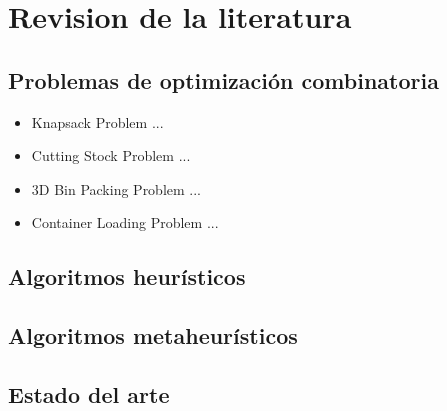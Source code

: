 
\section{Revision de la literatura}

\subsection{Problemas de optimización combinatoria}

    \begin{itemize}
        \item{Knapsack Problem ...}
        \item{Cutting Stock Problem ...}
        \item{3D Bin Packing Problem ...}
        \item{Container Loading Problem ...}
    \end{itemize}
    
\subsection{Algoritmos heurísticos}
    
    \lipsum[2]
    
\subsection{Algoritmos metaheurísticos}

    \lipsum[2]

\subsection{Estado del arte}

    \lipsum[2]
